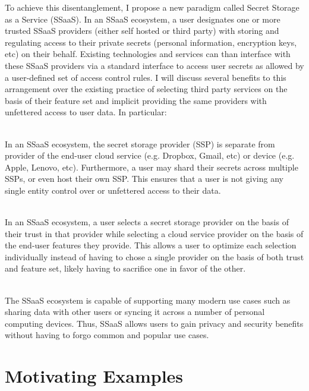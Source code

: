 To achieve this disentanglement, I propose a new paradigm called
Secret Storage as a Service (SSaaS). In an SSaaS ecosystem, a user
designates one or more trusted SSaaS providers (either self hosted or
third party) with storing and regulating access to their private
secrets (personal information, encryption keys, etc) on their
behalf. Existing technologies and services can than interface with
these SSaaS providers via a standard interface to access user secrets
as allowed by a user-defined set of access control rules. I will
discuss several benefits to this arrangement over the existing
practice of selecting third party services on the basis of their
feature set and implicit providing the same providers with unfettered
access to user data. In particular:

\begin{packed_desc}
\item[No Single Trusted Third Party] \hfill \\ In an SSaaS ecosystem,
  the secret storage provider (SSP) is separate from provider of the
  end-user cloud service (e.g. Dropbox, Gmail, etc) or device
  (e.g. Apple, Lenovo, etc). Furthermore, a user may shard their
  secrets across multiple SSPs, or even host their own SSP. This
  ensures that a user is not giving any single entity control over or
  unfettered access to their data.
\item[Separation of Duties] \hfill \\
  In an SSaaS ecosystem, a user selects a secret storage provider on
  the basis of their trust in that provider while selecting a cloud
  service provider on the basis of the end-user features they
  provide. This allows a user to optimize each selection individually
  instead of having to chose a single provider on the basis of both
  trust and feature set, likely having to sacrifice one in favor of
  the other.
\item[Support for Existing Use Cases] \hfill \\ The SSaaS ecosystem is
  capable of supporting many modern use cases such as sharing data
  with other users or syncing it across a number of personal computing
  devices. Thus, SSaaS allows users to gain privacy and security
  benefits without having to forgo common and popular use cases.
\end{packed_desc}

\section{Motivating Examples}

